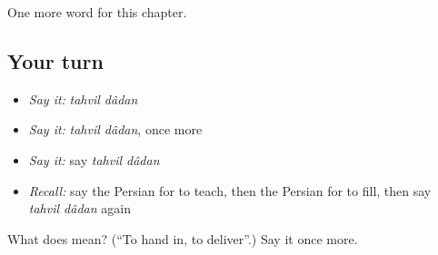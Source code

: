 \begin{grammarlens}[title={What you've built}]
One more word for this chapter.
\end{grammarlens}

\subsection*{Your turn}
\begin{itemize}
\raggedright
  \item \emph{Say it:} \emph{tahvil dâdan}
  \item \emph{Say it:} \emph{tahvil dâdan}, once more
  \item \emph{Say it:} say \emph{tahvil dâdan}
  \item \emph{Recall:} say the Persian for to teach, then the Persian for to fill, then say \emph{tahvil dâdan} again
\end{itemize}

\begin{tcolorbox}[breakable,colback=teal!4,colframe=teal!35!black,title={Before you move on}]
What does   mean? (\textquotedblleft{}To hand in, to deliver\textquotedblright{}.) Say it once more.
\end{tcolorbox}

